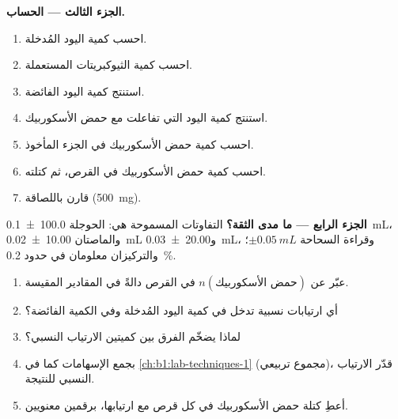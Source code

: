 \begin{problem}
\medskip
\noindent\textbf{الجزء الثالث --- الحساب.}
\begin{enumerate}[resume]
  \item احسب كمية اليود المُدخلة.
  \item احسب كمية الثيوكبريتات المستعملة.
  \item استنتج كمية اليود الفائضة.
  \item استنتج كمية اليود التي تفاعلت مع حمض الأسكوربيك.
  \item احسب كمية حمض الأسكوربيك في الجزء المأخوذ.
  \item احسب كمية حمض الأسكوربيك في القرص، ثم كتلته.
  \item قارن باللصاقة (\qty{500}{mg}).
\end{enumerate}

\medskip
\noindent\textbf{الجزء الرابع --- ما مدى الثقة؟}
التفاوتات المسموحة هي: الحوجلة \qty{100.0 \pm 0.1}{mL}، والماصتان
\qty{10.00 \pm 0.02}{mL} و\qty{20.00 \pm 0.03}{mL}، وقراءة السحاحة
$\pm\qty{0.05}{mL}$؛ والتركيزان معلومان في حدود \qty{0.2}{\percent}.
\begin{enumerate}[resume]
  \item عبّر عن $n(\text{حمض الأسكوربيك})$ في القرص دالةً في
        المقادير المقيسة.
  \item أي ارتيابات نسبية تدخل في كمية اليود المُدخلة
        وفي الكمية الفائضة؟
  \item لماذا يضخّم الفرق بين كميتين الارتياب
        النسبي؟
  \item بجمع الإسهامات كما في \cref{ch:b1:lab-techniques-1}
        (مجموع تربيعي)، قدّر الارتياب النسبي للنتيجة.
  \item أعطِ كتلة حمض الأسكوربيك في كل قرص مع ارتيابها،
        برقمين معنويين.
\end{enumerate}
\end{problem}

